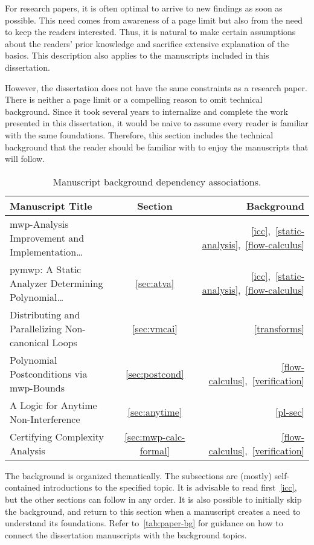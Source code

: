 For research papers, it is often optimal to arrive to new findings as soon as possible.
This need comes from awareness of a page limit but also from the need to keep the readers interested.
Thus, it is natural to make certain assumptions about the readers' prior knowledge and sacrifice extensive explanation of the basics.
This description also applies to the manuscripts included in this dissertation.

However, the dissertation does not have the same constraints as a research paper.
There is neither a page limit or a compelling reason to omit technical background.
Since it took several years to internalize and complete the work presented in this dissertation, it would be naive to assume every reader is familiar with the same foundations.
Therefore, this section includes the technical background that the reader should be familiar with to enjoy the manuscripts that will follow.

\begin{table}[h!]
\begin{NiceTabularX}{\linewidth}{@{}Xcr@{}}
\toprule
\textbf{Manuscript Title} & \textbf{Section} & \textbf{Background} \\
\midrule
{mwp-Analysis Improvement and Implementation\ldots}
    & 
    & \ref{icc},~\ref{static-analysis},~\ref{flow-calculus} \\
{pymwp: A Static Analyzer Determining Polynomial\ldots}
    & \ref{sec:atva}
    & \ref{icc},~\ref{static-analysis},~\ref{flow-calculus} \\
{Distributing and Parallelizing Non-canonical Loops}
    & \ref{sec:vmcai}
    & \ref{transforms} \\
{Polynomial Postconditions via mwp-Bounds}
    & \ref{sec:postcond}
    & \ref{flow-calculus},~\ref{verification} \\
{A Logic for Anytime Non-Interference}
    & \ref{sec:anytime}
    & \ref{pl-sec} \\
{Certifying Complexity Analysis}
    & \ref{sec:mwp-calc-formal}
    & \ref{flow-calculus},~\ref{verification} \\
\bottomrule
\end{NiceTabularX}
\caption[Manuscript background dependency associations]
{Manuscript background dependency associations.}
\label{tab:paper-bg}
\end{table}

The background is organized thematically.
The subsections are (mostly) self-contained introductions to the specified topic.
It is advisable to read first~\autoref{icc}, but the other sections can follow in any order.
It is also possible to initially skip the background, and return to this section when a manuscript creates a need to understand its foundations.
Refer to~\autoref{tab:paper-bg} for guidance on how to connect the dissertation manuscripts with the background topics.
